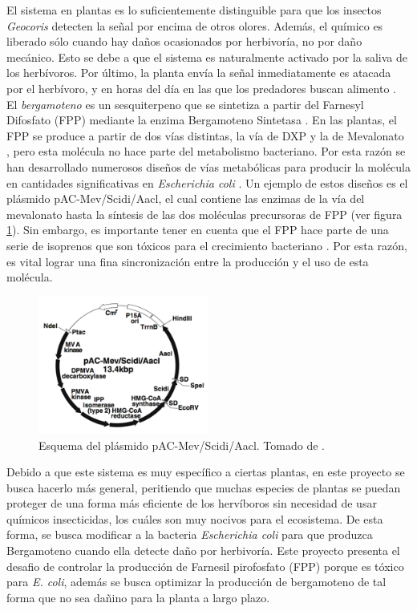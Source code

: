 \documentclass[12pt]{article}
\begin{document}
El sistema en plantas es lo suficientemente distinguible para que los insectos \emph{Geocoris} detecten la señal por encima de otros olores. Además, el químico es liberado s\'olo cuando hay daños ocasionados por herbivor\'ia, no por daño mec\'anico. Esto se debe a que el sistema es naturalmente activado por la saliva de los herb\'ivoros. Por \'ultimo, la planta env\'ia la se\~nal inmediatamente es atacada por el herb\'ivoro, y en horas del d\'ia en las que los predadores buscan alimento \cite{turlings95}.\\

El \emph{bergamoteno} es un sesquiterpeno que se sintetiza a partir del Farnesyl Difosfato (FPP) mediante la enzima Bergamoteno Sintetasa \cite{sallaud09}. En las plantas, el FPP se produce a partir de dos v\'ias distintas, la v\'ia de DXP y la de Mevalonato \cite{kirby09}, pero esta mol\'ecula no hace parte del metabolismo bacteriano. Por esta raz\'on se han desarrollado numerosos dise\~nos de v\'ias metab\'olicas para producir la mol\'ecula en cantidades significativas en \emph{Escherichia coli} \cite{harada09b}. Un ejemplo de estos dise\~nos es el pl\'asmido pAC-Mev/Scidi/Aacl, el cual contiene las enzimas de la v\'ia del mevalonato hasta la s\'intesis de las dos mol\'eculas precursoras de FPP (ver figura \ref{fig:pac}). Sin embargo, es importante tener en cuenta que el FPP hace parte de una serie de isoprenos que son t\'oxicos para el crecimiento bacteriano \cite{harada09b}. Por esta raz\'on, es vital lograr una fina sincronizaci\'on entre la producci\'on y el uso de esta mol\'ecula.\\

\begin{figure}[H]
  \centering
  \includegraphics[width=0.5\textwidth]{aaaa.png}
  \caption{\label{fig:pac} Esquema del pl\'asmido pAC-Mev/Scidi/Aacl. Tomado de \cite{harada09b}.}
 \end{figure}


Debido a que este sistema es muy espec\'ifico a ciertas plantas, en este proyecto se busca hacerlo m\'as general, peritiendo que muchas especies de plantas se puedan proteger de una forma m\'as eficiente de los herv\'iboros sin necesidad de usar qu\'imicos insecticidas, los cu\'ales son muy nocivos para el ecosistema. De esta forma, se busca modificar a la bacteria \emph{Escherichia coli} para que produzca Bergamoteno cuando ella detecte da\~no por herbivor\'ia. Este proyecto presenta el desafio de controlar la producci\'on de Farnesil pirofosfato (FPP) porque es t\'oxico para \emph{E. coli}, adem\'as se busca optimizar la producci\'on de bergamoteno de tal forma que no sea da\~nino para la planta a largo plazo.\\
\end{document}
